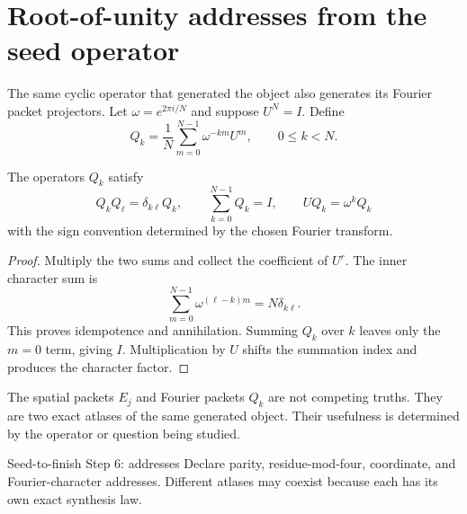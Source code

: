
\section{Root-of-unity addresses from the seed operator}
The same cyclic operator that generated the object also generates its Fourier packet projectors.  Let $\omega=e^{2\pi i/N}$ and suppose $U^N=I$.  Define
\[
Q_k
=
\frac1N\sum_{m=0}^{N-1}\omega^{-km}U^m,
\qquad 0\le k<N.
\]

\begin{theorem}\label{thm:character-projectors}
The operators $Q_k$ satisfy
\[
Q_kQ_\ell=\delta_{k\ell}Q_k,
\qquad
\sum_{k=0}^{N-1}Q_k=I,
\qquad
UQ_k=\omega^kQ_k
\]
with the sign convention determined by the chosen Fourier transform.
\end{theorem}

\begin{proof}
Multiply the two sums and collect the coefficient of $U^r$.  The inner character sum is
\[
\sum_{m=0}^{N-1}\omega^{(\ell-k)m}
=
N\delta_{k\ell}.
\]
This proves idempotence and annihilation.  Summing $Q_k$ over $k$ leaves only the $m=0$ term, giving $I$.  Multiplication by $U$ shifts the summation index and produces the character factor.
\end{proof}

\begin{remark}
The spatial packets $E_j$ and Fourier packets $Q_k$ are not competing truths.  They are two exact atlases of the same generated object.  Their usefulness is determined by the operator or question being studied.
\end{remark}

\begin{stepbox}{Seed-to-finish Step 6: addresses}
Declare parity, residue-mod-four, coordinate, and Fourier-character addresses.  Different atlases may coexist because each has its own exact synthesis law.
\end{stepbox}

